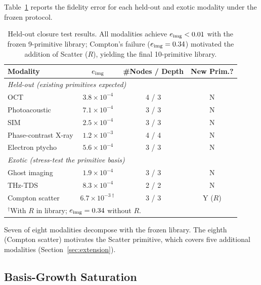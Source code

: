 \documentclass[11pt]{article}
\begin{document}
Table~\ref{tab:closure} reports the fidelity error for each held-out and exotic modality under the frozen protocol.

\begin{table}[htbp]
\centering
\caption{Held-out closure test results. All modalities achieve $e_{\mathrm{img}} < 0.01$ with the frozen 9-primitive library; Compton's failure ($e_{\mathrm{img}} = 0.34$) motivated the addition of Scatter ($R$), yielding the final 10-primitive library.} \label{tab:closure}
\begin{tabular}{l c c c}
\toprule
\textbf{Modality} & $e_{\mathrm{img}}$ & \textbf{\#Nodes / Depth} & \textbf{New Prim.?} \\
\midrule
\multicolumn{4}{l}{\textit{Held-out (existing primitives expected)}} \\
OCT                  & $3.8 \times 10^{-4}$ & 4 / 3 & N \\
Photoacoustic        & $7.1 \times 10^{-4}$ & 3 / 3 & N \\
SIM                  & $2.5 \times 10^{-4}$ & 3 / 3 & N \\
Phase-contrast X-ray & $1.2 \times 10^{-3}$ & 4 / 4 & N \\
Electron ptycho      & $5.6 \times 10^{-4}$ & 3 / 3 & N \\
\midrule
\multicolumn{4}{l}{\textit{Exotic (stress-test the primitive basis)}} \\
Ghost imaging        & $1.9 \times 10^{-4}$ & 3 / 3 & N \\
THz-TDS              & $8.3 \times 10^{-4}$ & 2 / 2 & N \\
Compton scatter      & $6.7 \times 10^{-3\dagger}$ & 3 / 3 & Y ($R$) \\
\bottomrule
\multicolumn{4}{l}{\footnotesize $^{\dagger}$With $R$ in library; $e_{\mathrm{img}} = 0.34$ without $R$.}
\end{tabular}
\end{table}

Seven of eight modalities decompose with the frozen library. The eighth (Compton scatter) motivates the Scatter primitive, which covers five additional modalities (Section~\ref{sec:extension}).

\subsection{Basis-Growth Saturation}
\end{document}
